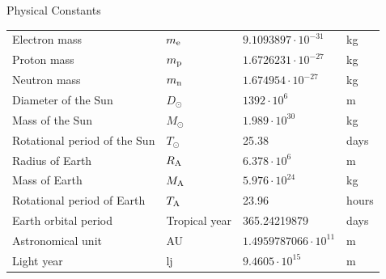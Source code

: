 \documentclass[10pt]{beamer}
\begin{document}
\begin{frame}[shrink=40]{Physical Constants}
\begin{center}
\begin{tabular}{||l|lll||}
\hline
Electron mass                &$m_{\rm e}$&$9.1093897\cdot10^{-31}$&kg\rule{0pt}{13pt}\\
Proton mass                  &$m_{\rm p}$&$1.6726231\cdot10^{-27}$&kg\\
Neutron mass                 &$m_{\rm n}$&$1.674954\cdot10^{-27}$&kg\\
\hline
Diameter of the Sun          &$D_\odot$&$1392\cdot10^6$&m\rule{0pt}{13pt}\\
Mass of the Sun              &$M_\odot$&$1.989\cdot10^{30}$&kg\\
Rotational period of the Sun &$T_\odot$&25.38&days\\
Radius of Earth              &$R_{\rm A}$&$6.378\cdot10^6$&m\\
Mass of Earth                &$M_{\rm A}$&$5.976\cdot10^{24}$&kg\\
Rotational period of Earth   &$T_{\rm A}$&23.96&hours\\
Earth orbital period         &Tropical year&365.24219879&days\\
Astronomical unit            &AU&$1.4959787066\cdot10^{11}$&m\\
Light year                   &lj&$9.4605\cdot10^{15}$&m\\
\hline
\end{tabular}
\label{PhysicalConstants}
\end{center}


\end{frame}
\end{document}
